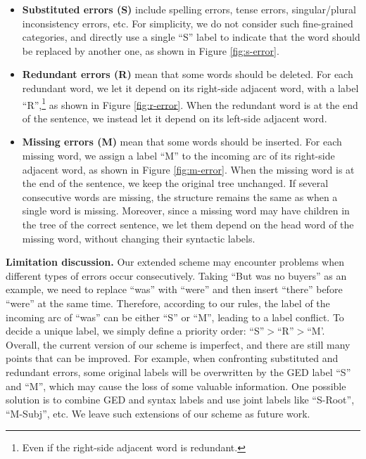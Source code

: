 \documentclass[11pt]{article}
\begin{document}
\begin{itemize}
    \item \textbf{Substituted errors (S)} include spelling errors, tense errors, singular/plural inconsistency errors, etc. For simplicity, we do not consider such fine-grained categories, and directly use a single ``S'' label to indicate that the word should be replaced by another one, as shown in Figure \ref{fig:s-error}.
    \item \textbf{Redundant errors (R)} mean that some words should be deleted. For each redundant word, we let it depend on its right-side adjacent word, with a label ``R'',\footnote{Even if the right-side adjacent word is redundant.} as shown in Figure \ref{fig:r-error}. When the redundant word is at the end of the sentence, we instead let it depend on its left-side adjacent word. 
    \item \textbf{Missing errors (M)} mean that some words should be inserted. For each missing word, we assign a label ``M'' to the incoming arc of its right-side adjacent word, as shown in Figure \ref{fig:m-error}. When the missing word is at the end of the sentence, we  keep the original tree unchanged. If several consecutive words are missing, the structure remains the same as when a single word is  missing.  Moreover, since a missing word may have children in the tree of the correct sentence, we let them depend on the head word of the missing word, without changing their  syntactic labels. 
\end{itemize}











\textbf{Limitation discussion.} Our extended scheme may 
encounter problems when different types of errors occur consecutively. Taking ``But was no buyers'' as an example, we need to replace ``was'' with ``were'' and then insert ``there'' before ``were'' at the same time. 
Therefore, according to our rules, the label of the incoming arc of ``was'' can be either ``S'' or ``M'', leading to a label conflict. 
To decide a unique label, we simply define a priority order: ``S''$>$``R''$>$``M'.
Overall, the current version of our scheme is imperfect, and there are still many points that can be improved. For example, when confronting substituted and redundant errors, some original labels will be overwritten by the GED label ``S'' and ``M'', which may cause the loss of some valuable information. One possible solution is to combine GED and syntax labels and use joint labels like ``S-Root'', ``M-Subj'', etc. We leave such extensions of our scheme as future work.
\end{document}
